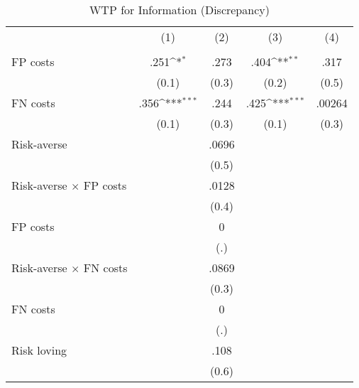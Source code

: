 \begin{table}[htbp]\centering
\def\sym#1{\ifmmode^{#1}\else\(^{#1}\)\fi}
\caption{WTP for Information (Discrepancy)}
\begin{tabular}{l*{4}{c}}
\hline\hline
                &\multicolumn{1}{c}{(1)}&\multicolumn{1}{c}{(2)}&\multicolumn{1}{c}{(3)}&\multicolumn{1}{c}{(4)}\\
                &\multicolumn{1}{c}{}&\multicolumn{1}{c}{}&\multicolumn{1}{c}{}&\multicolumn{1}{c}{}\\
\hline
FP costs        &     .251\sym{*}  &     .273         &     .404\sym{**} &     .317         \\
                &    (0.1)         &    (0.3)         &    (0.2)         &    (0.5)         \\
FN costs        &     .356\sym{***}&     .244         &     .425\sym{***}&   .00264         \\
                &    (0.1)         &    (0.3)         &    (0.1)         &    (0.3)         \\
Risk-averse     &                  &    .0696         &                  &                  \\
                &                  &    (0.5)         &                  &                  \\
Risk-averse $\times$ FP costs&                  &    .0128         &                  &                  \\
                &                  &    (0.4)         &                  &                  \\
FP costs        &                  &        0         &                  &                  \\
                &                  &      (.)         &                  &                  \\
Risk-averse $\times$ FN costs&                  &    .0869         &                  &                  \\
                &                  &    (0.3)         &                  &                  \\
FN costs        &                  &        0         &                  &                  \\
                &                  &      (.)         &                  &                  \\
Risk loving     &                  &     .108         &                  &                  \\
                &                  &    (0.6)         &                  &                  \\

\end{tabular}
\end{table}
